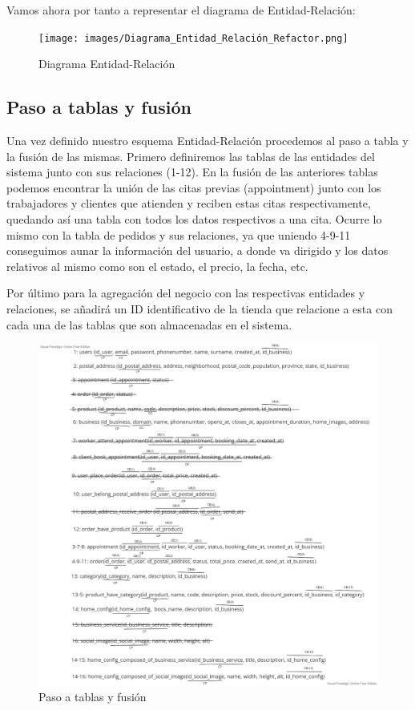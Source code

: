 Vamos ahora por tanto a representar el diagrama de Entidad-Relación: 

\begin{figure}[H]
  \centering
  \texttt{[image: images/Diagrama\_Entidad\_Relación\_Refactor.png]}
  \caption{Diagrama Entidad-Relación}
  \label{}
\end{figure}

\subsection{Paso a tablas y fusión}

Una vez definido nuestro esquema Entidad-Relación procedemos al paso a tabla y la fusión de las mismas. Primero definiremos las tablas de las entidades del sistema junto con sus relaciones (1-12). En la fusión de las anteriores tablas podemos encontrar la unión de las citas previas (appointment) junto con los trabajadores y clientes que atienden y reciben estas citas respectivamente, quedando así una tabla con todos los datos respectivos a una cita. Ocurre lo mismo con la tabla de pedidos y sus relaciones, ya que uniendo 4-9-11 conseguimos aunar la información del usuario, a donde va dirigido y los datos relativos al mismo como son el estado, el precio, la fecha, etc.


Por último para la agregación del negocio con las respectivas entidades y relaciones, se añadirá un ID identificativo de la tienda que relacione a esta con cada una de las tablas que son almacenadas en el sistema.

\begin{figure}[H]
  \centering
  \includegraphics[scale=0.3]{images/Paso_a_Tablas_Negocio_Refactor.png}
  \caption{Paso a tablas y fusión}
  \label{}
\end{figure}


